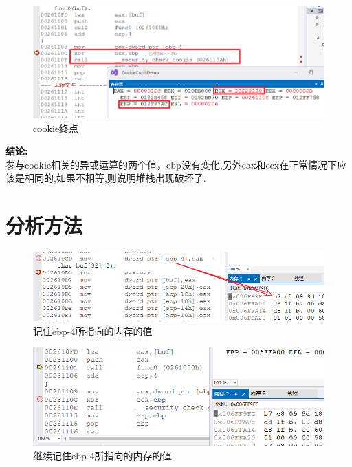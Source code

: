 \documentclass[AutoFakeBold,AutoFakeSlant]{beamer}
\begin{document}
	\begin{frame} 
		\begin{figure}
			\centering %
			\includegraphics[width=\linewidth]{1211cookie02}
			\caption{cookie终点}
			\label{fig:cookie02}
		\end{figure}
	\end{frame}
	
	\begin{frame} 
		\textbf{结论:}\\
		参与cookie相关的异或运算的两个值，ebp没有变化,另外eax和ecx在正常情况下应该是相同的,如果不相等,则说明堆栈出现破坏了.
	\end{frame}
		
	\section{分析方法}
	\begin{frame}[fragile]
		\begin{figure}
			\centering %
			\includegraphics[width=\linewidth]{1211memwatch1}
			\caption{记住ebp-4所指向的内存的值}
			\label{fig:1211memwatch1}
		\end{figure}
	\end{frame}
	
	\begin{frame} 
		\begin{figure}
			\centering %
			\includegraphics[width=\linewidth]{1211memwatch2}
			\caption{继续记住ebp-4所指向的内存的值}
			\label{fig:1211memwatch2}
		\end{figure}
	\end{frame}
	
\end{document}
